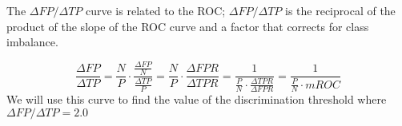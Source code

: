 The $\Delta FP/\Delta TP$ curve is related to the ROC; $\Delta FP/\Delta TP$ is the reciprocal of the product of the slope of the ROC curve and a factor that corrects for class imbalance. 


$$
\frac{\Delta FP}{\Delta TP} = 
\frac{N}{P} \cdot \frac{\frac{\Delta FP}{N}}{\frac{\Delta TP}{P}}
= \frac{N}{P} \cdot \frac{\Delta FPR}{\Delta TPR}
= \frac{1}{\frac{P}{N} \cdot \frac{\Delta TPR}{\Delta FPR}}
= \frac{1}{\frac{P}{N} \cdot mROC}
$$
 We will use this curve to find the value of the discrimination threshold where $\Delta FP/\Delta TP = 2.0$











